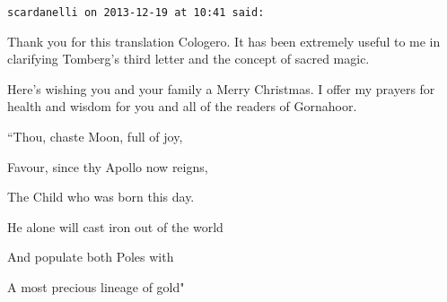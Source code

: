 \begin{footnotesize}\begin{sffamily}

\texttt{scardanelli on 2013-12-19 at 10:41 said: }

Thank you for this translation Cologero. It has been extremely useful to me in clarifying Tomberg's third letter and the concept of sacred magic.

Here's wishing you and your family a Merry Christmas. I offer my prayers for health and wisdom for you and all of the readers of Gornahoor.

``Thou, chaste Moon, full of joy,

Favour, since thy Apollo now reigns,

The Child who was born this day.

He alone will cast iron out of the world

And populate both Poles with

A most precious lineage of gold"


\end{sffamily}\end{footnotesize}
